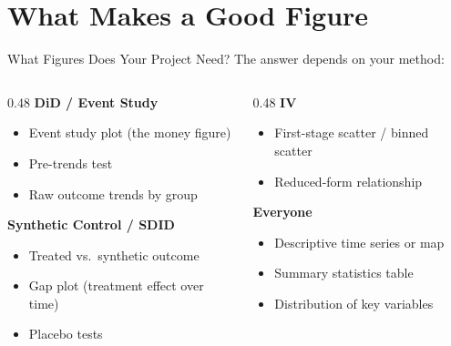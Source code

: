 \section{What Makes a Good Figure}

\begin{frame}{What Figures Does Your Project Need?}
  \small
  The answer depends on your method:

  \vspace{6pt}

  \begin{columns}[T]
    \begin{column}{0.48\textwidth}
      \textbf{\textcolor{usfgreen}{DiD / Event Study}}
      \begin{itemize}\setlength\itemsep{0pt}
        \item Event study plot (the money figure)
        \item Pre-trends test
        \item Raw outcome trends by group
      \end{itemize}

      \vspace{4pt}

      \textbf{\textcolor{usfgreen}{Synthetic Control / SDID}}
      \begin{itemize}\setlength\itemsep{0pt}
        \item Treated vs.\ synthetic outcome
        \item Gap plot (treatment effect over time)
        \item Placebo tests
      \end{itemize}
    \end{column}
    \begin{column}{0.48\textwidth}
      \textbf{\textcolor{usfgreen}{IV}}
      \begin{itemize}\setlength\itemsep{0pt}
        \item First-stage scatter / binned scatter
        \item Reduced-form relationship
      \end{itemize}

      \vspace{4pt}

      \textbf{\textcolor{usfgreen}{Everyone}}
      \begin{itemize}\setlength\itemsep{0pt}
        \item Descriptive time series or map
        \item Summary statistics table
        \item Distribution of key variables
      \end{itemize}
    \end{column}
  \end{columns}
\end{frame}


